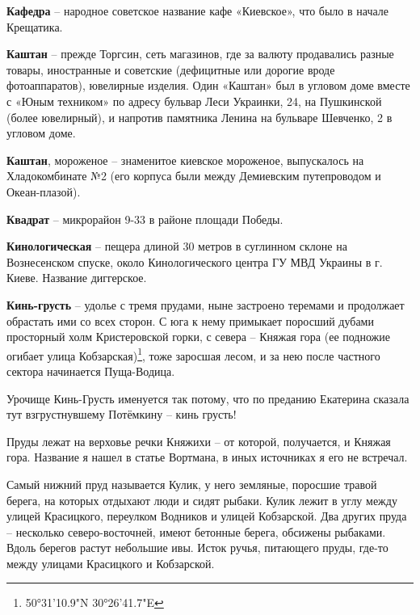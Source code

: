 \textbf{Кафедра} – народное советское название кафе «Киевское», что было в начале Крещатика.\\

\medskip

\textbf{Каштан} – прежде Торгсин, сеть магазинов, где за валюту продавались разные товары, иностранные и советские (дефицитные или дорогие вроде фотоаппаратов), ювелирные изделия. Один «Каштан» был в угловом доме вместе с «Юным техником» по адресу бульвар Леси Украинки, 24, на Пушкинской (более ювелирный), и напротив памятника Ленина на бульваре Шевченко, 2 в угловом доме.\\

\medskip

\textbf{Каштан}, мороженое – знаменитое киевское мороженое, выпускалось на Хладокомбинате №2 (его корпуса были между Демиевским путепроводом и Океан-плазой).\\

\medskip

\textbf{Квадрат} – микрорайон 9-33 в районе площади Победы.\\

\medskip

\textbf{Кинологическая} – пещера длиной 30 метров в суглинном склоне на Вознесенском спуске, около Кинологического центра ГУ МВД Украины в г. Киеве. Название диггерское.\\

\medskip

\textbf{Кинь-грусть} – удолье с тремя прудами, ныне застроено теремами и продолжает обрастать ими со всех сторон. С юга к нему примыкает поросший дубами просторный холм Кристеровской горки, с севера – Княжая гора (ее подножие огибает улица Кобзарская)\footnote{50°31'10.9"N 30°26'41.7"E}, тоже заросшая лесом, и за нею после частного сектора начинается Пуща-Водица. 

Урочище Кинь-Грусть именуется так потому, что по преданию Екатерина сказала тут взгрустнувшему Потёмкину – кинь грусть!

Пруды лежат на верховье речки Княжихи – от которой, получается, и Княжая гора. Название я нашел в статье Вортмана, в иных источниках я его не встречал. 

Самый нижний пруд называется Кулик, у него земляные, поросшие травой берега, на которых отдыхают люди и сидят рыбаки. Кулик лежит в углу между улицей Красицкого, переулком Водников и улицей Кобзарской. Два других пруда – несколько северо-восточней, имеют бетонные берега, обсижены рыбаками. Вдоль берегов растут небольшие ивы. Исток ручья, питающего пруды, где-то между улицами Красицкого и Кобзарской.


